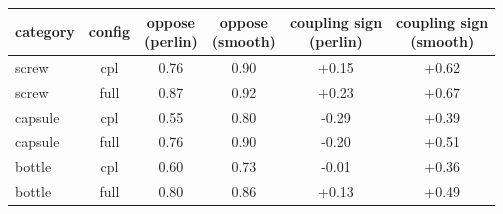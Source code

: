 \setlength{\tabcolsep}{3pt}
\begin{tabular}{@{}lccccc@{}}
\toprule
category & config & \shortstack{oppose\\(perlin)} & \shortstack{oppose\\(smooth)} & \shortstack{coupling sign\\(perlin)} & \shortstack{coupling sign\\(smooth)} \\
\midrule
screw & cpl & 0.76 & 0.90 & +0.15 & +0.62 \\
screw & full & 0.87 & 0.92 & +0.23 & +0.67 \\
capsule & cpl & 0.55 & 0.80 & -0.29 & +0.39 \\
capsule & full & 0.76 & 0.90 & -0.20 & +0.51 \\
bottle & cpl & 0.60 & 0.73 & -0.01 & +0.36 \\
bottle & full & 0.80 & 0.86 & +0.13 & +0.49 \\
\bottomrule
\end{tabular}
